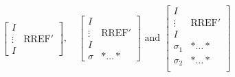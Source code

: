 \documentclass[]{standalone}
\begin{document}
$
\left[
\begin{array}{c|c}
I   &  \\
\vdots & \mbox{RREF}' \\
I   &
\end{array}
\right],\quad
\left[
\begin{array}{c|c}
I      &              \\
\vdots & \mbox{RREF}' \\
I      & \\ \hline
\sigma &  * \ldots *  
\end{array}
\right]
\mbox{ and }
\left[
\begin{array}{c|c}
I      &               \\
\vdots &  \mbox{RREF}' \\
I      & \\ \hline
\sigma_1 &  * \ldots * \\
\sigma_2 &  * \ldots * \\
\end{array}
\right]
$ 
\end{document}
